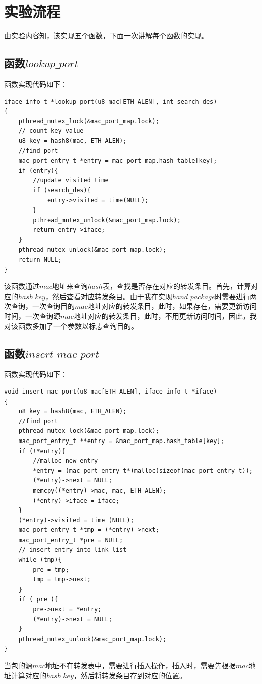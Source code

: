 \documentclass[UTF8,noindent]{ctexart}
\begin{document}
		\section*{{实验流程}}

由实验内容知，该实现五个函数，下面一次讲解每个函数的实现。

\subsection*{函数$lookup\_port$}
函数实现代码如下：
\begin{lstlisting}
iface_info_t *lookup_port(u8 mac[ETH_ALEN], int search_des)
{
	pthread_mutex_lock(&mac_port_map.lock);
	// count key value
	u8 key = hash8(mac, ETH_ALEN);
	//find port
	mac_port_entry_t *entry = mac_port_map.hash_table[key];
	if (entry){
		//update visited time
		if (search_des){
			entry->visited = time(NULL);
		}
		pthread_mutex_unlock(&mac_port_map.lock);
		return entry->iface;
	}
	pthread_mutex_unlock(&mac_port_map.lock);
	return NULL;
}
\end{lstlisting}
该函数通过$mac$地址来查询$hash$表，查找是否存在对应的转发条目。首先，计算对应的$hash\ key$，然后查看对应转发条目。由于我在实现$hand\_package$时需要进行两次查询，一次查询目的$mac$地址对应的转发条目，此时，如果存在，需要更新访问时间，一次查询源$mac$地址对应的转发条目，此时，不用更新访问时间，因此，我对该函数多加了一个参数以标志查询目的。

\subsection*{函数$insert\_mac\_port$}
函数实现代码如下：
\begin{lstlisting}
void insert_mac_port(u8 mac[ETH_ALEN], iface_info_t *iface)
{
	u8 key = hash8(mac, ETH_ALEN);
	//find port
	pthread_mutex_lock(&mac_port_map.lock);
	mac_port_entry_t **entry = &mac_port_map.hash_table[key];
	if (!*entry){
		//malloc new entry
		*entry = (mac_port_entry_t*)malloc(sizeof(mac_port_entry_t));
		(*entry)->next = NULL;
		memcpy((*entry)->mac, mac, ETH_ALEN);
		(*entry)->iface = iface;
	}
	(*entry)->visited = time (NULL);
	mac_port_entry_t *tmp = (*entry)->next;
	mac_port_entry_t *pre = NULL;
	// insert entry into link list
	while (tmp){
		pre = tmp;
		tmp = tmp->next;
	}
	if ( pre ){
		pre->next = *entry;
		(*entry)->next = NULL;
	}
	pthread_mutex_unlock(&mac_port_map.lock);
}
\end{lstlisting}
当包的源$mac$地址不在转发表中，需要进行插入操作，插入时，需要先根据$mac$地址计算对应的$hash\ key$，然后将转发条目存到对应的位置。
\end{document}
